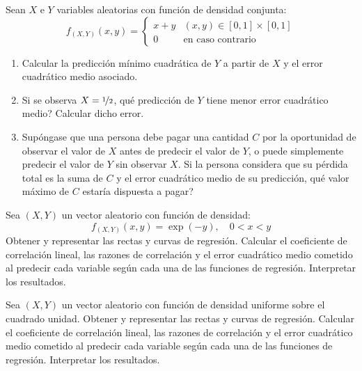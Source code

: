 \begin{ejercicio}
    Sean $X$ e $Y$ variables aleatorias con función de densidad conjunta:
    \begin{equation*}
        f_{(X,Y)}(x, y) = \begin{cases}
            x+y & (x, y) \in [0,1] \times [0,1]\\
            0 & \text{en caso contrario}
        \end{cases}
    \end{equation*}
    \begin{enumerate}
        \item Calcular la predicción mínimo cuadrática de $Y$ a partir de $X$ y el error cuadrático medio asociado.
        \item Si se observa $X = \nicefrac{1}{2}$, qué predicción de $Y$ tiene menor error cuadrático medio? Calcular dicho error.
        \item Supóngase que una persona debe pagar una cantidad $C$ por la oportunidad de observar el valor de $X$ antes de predecir el valor de $Y$, o puede simplemente predecir el valor de $Y$ sin observar $X$. Si la persona considera que su pérdida total es la suma de $C$ y el error cuadrático medio de su predicción, qué valor máximo de $C$ estaría dispuesta a pagar?
    \end{enumerate}
\end{ejercicio}

\begin{ejercicio}
    Sea $(X,Y)$ un vector aleatorio con función de densidad:
    \begin{equation*}
        f_{(X,Y)}(x, y) = \exp(-y), \quad 0 < x < y
    \end{equation*}
    Obtener y representar las rectas y curvas de regresión. Calcular el coeficiente de correlación lineal, las razones de correlación y el error cuadrático medio cometido al predecir cada variable según cada una de las funciones de regresión. Interpretar los resultados.
\end{ejercicio}

\begin{ejercicio}
    Sea $(X,Y)$ un vector aleatorio con función de densidad uniforme sobre el cuadrado unidad. Obtener y representar las rectas y curvas de regresión. Calcular el coeficiente de correlación lineal, las razones de correlación y el error cuadrático medio cometido al predecir cada variable según cada una de las funciones de regresión. Interpretar los resultados.
\end{ejercicio}


